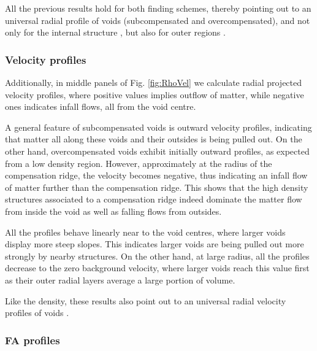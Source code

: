 \documentclass[a4,useAMS,usenatbib,usegraphicx]{mn2e}
\begin{document}
All the previous results hold for both finding schemes, thereby pointing 
out to an universal radial profile of voids (subcompensated and 
overcompensated), and not only for the internal structure \citep{Colberg05, 
Ricciardelli2013}, but also for outer regions \citep{Lavaux12, Hamaus14}.


\subsubsection{Velocity profiles}
\label{subsubsec:velocity_voids}


Additionally, in middle panels of Fig. \ref{fig:RhoVel} we calculate 
radial projected velocity profiles, where positive values implies outflow 
of matter, while negative ones indicates infall flows, all from the void 
centre. 


A general feature of subcompensated voids is outward velocity profiles, 
indicating that matter all along these voids and their outsides is being 
pulled out. On the other hand, overcompensated voids exhibit initially
outward profiles, as expected from a low density region. However, 
approximately at the radius of the compensation ridge, the velocity becomes 
negative, thus indicating an infall flow of matter further than the 
compensation ridge. This shows that the high density structures associated 
to a compensation ridge indeed dominate the matter flow from inside the void 
as well as falling flows from outsides.


All the profiles behave linearly near to the void centres, where larger 
voids display more steep slopes. This indicates larger voids are being
pulled out more strongly by nearby structures. On the other hand, at 
large radius, all the profiles decrease to the zero background velocity,
where larger voids reach this value first as their outer radial layers 
average a large portion of volume.


Like the density, these results also point out to an universal radial 
velocity profiles of voids \citep{Hamaus14}.

\subsubsection{FA profiles}
\label{subsubsec:FA_voids}
\end{document}
